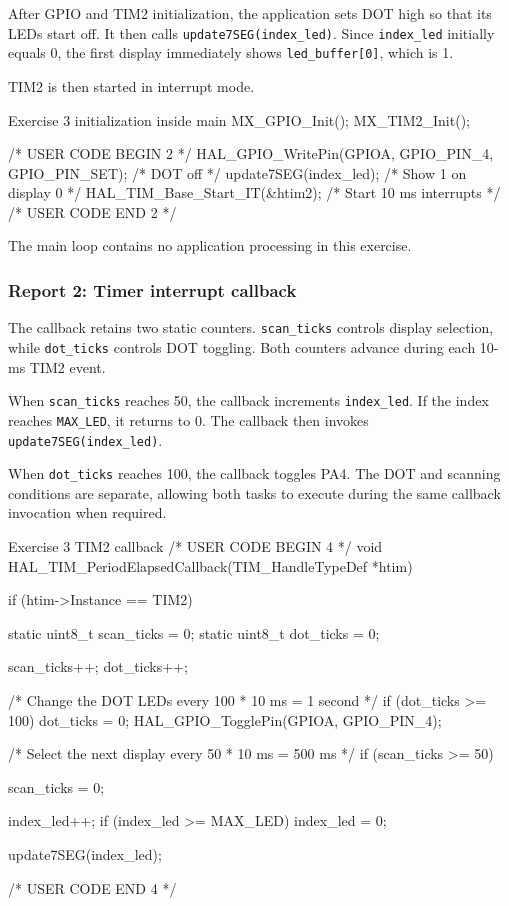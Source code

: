 \documentclass[a4paper]{article}
\begin{document}
After GPIO and TIM2 initialization, the application
sets DOT high so that its LEDs start off.
It then calls \texttt{update7SEG(index\_led)}.
Since \texttt{index\_led} initially equals 0,
the first display immediately shows
\texttt{led\_buffer[0]}, which is 1.

TIM2 is then started in interrupt mode.

\begin{stmcode}{Exercise 3 initialization inside main}
MX_GPIO_Init();
MX_TIM2_Init();

/* USER CODE BEGIN 2 */
HAL_GPIO_WritePin(GPIOA, GPIO_PIN_4, GPIO_PIN_SET); /* DOT off */
update7SEG(index_led);                              /* Show 1 on display 0 */
HAL_TIM_Base_Start_IT(&htim2);                       /* Start 10 ms interrupts */
/* USER CODE END 2 */
\end{stmcode}

The main loop contains no application processing
in this exercise.

\subsubsection{Report 2: Timer interrupt callback}

The callback retains two static counters.
\texttt{scan\_ticks} controls display selection,
while \texttt{dot\_ticks} controls DOT toggling.
Both counters advance during each 10-ms TIM2 event.

When \texttt{scan\_ticks} reaches 50, the callback
increments \texttt{index\_led}. If the index reaches
\texttt{MAX\_LED}, it returns to 0. The callback
then invokes \texttt{update7SEG(index\_led)}.

When \texttt{dot\_ticks} reaches 100, the callback
toggles PA4. The DOT and scanning conditions are
separate, allowing both tasks to execute during
the same callback invocation when required.

\begin{stmcode}{Exercise 3 TIM2 callback}
/* USER CODE BEGIN 4 */
void HAL_TIM_PeriodElapsedCallback(TIM_HandleTypeDef *htim)
{
    if (htim->Instance == TIM2)
    {
        static uint8_t scan_ticks = 0;
        static uint8_t dot_ticks = 0;

        scan_ticks++;
        dot_ticks++;

        /* Change the DOT LEDs every 100 * 10 ms = 1 second */
        if (dot_ticks >= 100)
        {
            dot_ticks = 0;
            HAL_GPIO_TogglePin(GPIOA, GPIO_PIN_4);
        }

        /* Select the next display every 50 * 10 ms = 500 ms */
        if (scan_ticks >= 50)
        {
            scan_ticks = 0;

            index_led++;
            if (index_led >= MAX_LED)
            {
                index_led = 0;
            }

            update7SEG(index_led);
        }
    }
}
/* USER CODE END 4 */
\end{stmcode}
\end{document}
